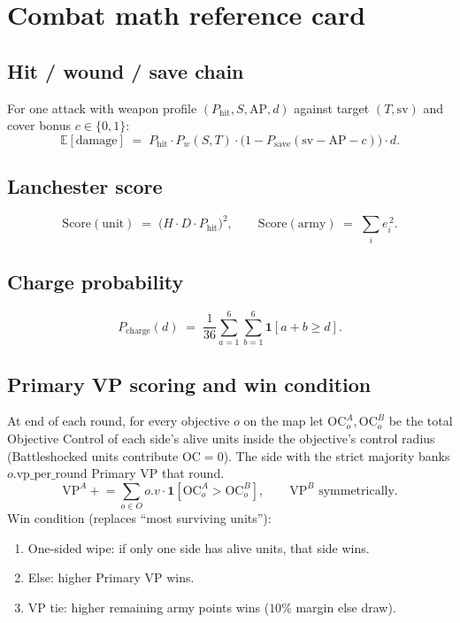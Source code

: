 \documentclass[11pt,a4paper]{article}
\begin{document}
\section{Combat math reference card}

\subsection{Hit / wound / save chain}
For one attack with weapon profile $(P_{\text{hit}}, S, \mathrm{AP}, d)$
against target $(T, \mathrm{sv})$ and cover bonus $c \in \{0,1\}$:
\[
  \mathbb{E}[\text{damage}]
  \;=\; P_{\text{hit}}
  \cdot P_w(S, T)
  \cdot \bigl(1 - P_{\text{save}}(\mathrm{sv} - \mathrm{AP} - c)\bigr)
  \cdot d.
\]

\subsection{Lanchester score}
\[
  \text{Score}(\text{unit}) \;=\; \bigl(H \cdot D \cdot P_{\text{hit}}\bigr)^2,
  \qquad
  \text{Score}(\text{army}) \;=\; \sum_i e_i^{\,2}.
\]

\subsection{Charge probability}
\[
  P_{\text{charge}}(d)
  \;=\; \frac{1}{36}
    \sum_{a=1}^{6} \sum_{b=1}^{6} \mathbf{1}\!\left[a+b \geq d\right].
\]

\subsection{Primary VP scoring and win condition}
At end of each round, for every objective $o$ on the map let
$\mathrm{OC}^A_o, \mathrm{OC}^B_o$ be the total Objective Control of
each side's alive units inside the objective's control radius
(Battleshocked units contribute $\mathrm{OC} = 0$). The side with the
strict majority banks $o.\text{vp\_per\_round}$ Primary VP that round.
\[
  \mathrm{VP}^A \mathrel{+}= \sum_{o \in O}
    o.v \cdot \mathbf{1}\!\left[\mathrm{OC}^A_o > \mathrm{OC}^B_o\right],
  \qquad
  \mathrm{VP}^B \text{ symmetrically}.
\]
Win condition (replaces ``most surviving units''):
\begin{enumerate}[itemsep=2pt]
  \item One-sided wipe: if only one side has alive units, that side wins.
  \item Else: higher Primary VP wins.
  \item VP tie: higher remaining army points wins ($10\%$ margin else
    draw).
\end{enumerate}
\end{document}

